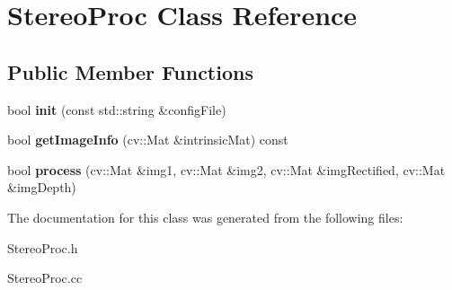 \hypertarget{classStereoProc}{
\section{StereoProc Class Reference}
\label{classStereoProc}
}
\subsection*{Public Member Functions}
\begin{DoxyCompactItemize}
\item 
\hypertarget{classStereoProc_aff469e6dd02c37a0bbef5dd65f81c5f8}{
bool {\bfseries init} (const std::string \&configFile)}
\label{classStereoProc_aff469e6dd02c37a0bbef5dd65f81c5f8}

\item 
\hypertarget{classStereoProc_a6ea6fb933e750afe168877b3ae236856}{
bool {\bfseries getImageInfo} (cv::Mat \&intrinsicMat) const }
\label{classStereoProc_a6ea6fb933e750afe168877b3ae236856}

\item 
\hypertarget{classStereoProc_a408873d509783f8a0f990621943c180d}{
bool {\bfseries process} (cv::Mat \&img1, cv::Mat \&img2, cv::Mat \&imgRectified, cv::Mat \&imgDepth)}
\label{classStereoProc_a408873d509783f8a0f990621943c180d}

\end{DoxyCompactItemize}


The documentation for this class was generated from the following files:\begin{DoxyCompactItemize}
\item 
StereoProc.h\item 
StereoProc.cc\end{DoxyCompactItemize}

